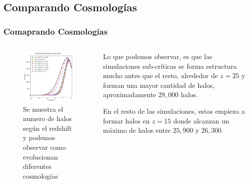 \documentclass{beamer}
\begin{document}
\subsection{Comparando Cosmologías}
	\begin{frame}
		\frametitle{Comaprando Cosmologías}
		\begin{columns}[t]
           	\begin{column}{.5\textwidth}

				\begin{figure}
					\centering
					\includegraphics[scale=0.31]{Conc/TotalHalos_Conc.png}
					\caption{\footnotesize Se muestra el numero de halos según el redshift y podemos observar como evolucionan diferentes cosmologías }
					\label{fig:TotalHalos_Conc}
				\end{figure}

	        \end{column}
    	    \begin{column}{.5\textwidth}

    	    	Lo que podemos observar, es que las simulaciones sub-críticas se forma estructura mucho antes que el resto, alrededor de $z=25$ y forman una mayor cantidad de halos, aproximadamente $28,000$ halos.
    	    	
    	    	En el resto de las simulaciones, estas empieza a formar halos en $z=15$ donde alcanzan un máximo de halos entre $25,900$ y $26,300$.

        	\end{column}
	    \end{columns}

	\end{frame}
\end{document}
